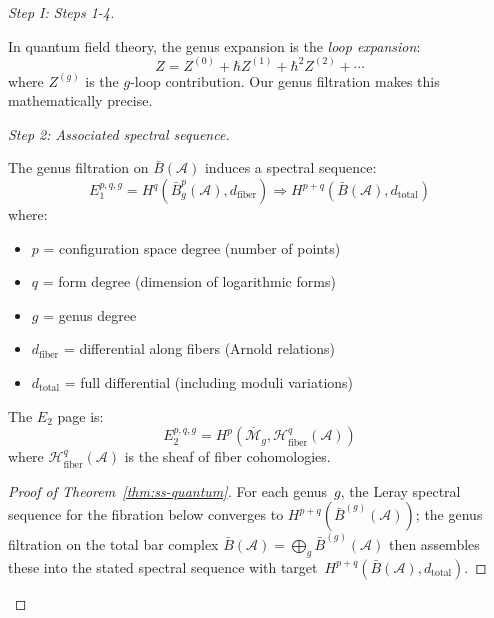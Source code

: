 \begin{proof}[Step I: Steps 1-4]
\begin{remark}
In quantum field theory, the genus expansion is the \emph{loop expansion}:
\begin{equation}
Z = Z^{(0)} + \hbar Z^{(1)} + \hbar^2 Z^{(2)} + \cdots
\end{equation}
where $Z^{(g)}$ is the $g$-loop contribution. Our genus filtration makes this 
mathematically precise.
\end{remark}

\emph{Step 2: Associated spectral sequence.}

\begin{theorem}
\label{thm:ss-quantum}
The genus filtration on $\bar{B}(\mathcal{A})$ induces a spectral sequence:
\begin{equation}
E_1^{p,q,g} = H^q\left(\bar{B}^p_g(\mathcal{A}), d_{\text{fiber}}\right) 
\Longrightarrow H^{p+q}\left(\bar{B}(\mathcal{A}), d_{\text{total}}\right)
\end{equation}
where:
\begin{itemize}
\item $p$ = configuration space degree (number of points)
\item $q$ = form degree (dimension of logarithmic forms)
\item $g$ = genus degree
\item $d_{\text{fiber}}$ = differential along fibers (Arnold relations)
\item $d_{\text{total}}$ = full differential (including moduli variations)
\end{itemize}

The $E_2$ page is:
\begin{equation}
E_2^{p,q,g} = H^p\left(\overline{\mathcal{M}}_g, \mathcal{H}^q_{\text{fiber}}(
\mathcal{A})\right)
\end{equation}
where $\mathcal{H}^q_{\text{fiber}}(\mathcal{A})$ is the sheaf of fiber cohomologies.
\end{theorem}

\begin{proof}[Proof of Theorem~\ref{thm:ss-quantum}]
For each genus~$g$, the Leray spectral sequence for the fibration
below converges to $H^{p+q}(\bar{B}^{(g)}(\mathcal{A}))$;
the genus filtration on the total bar complex
$\bar{B}(\mathcal{A}) = \bigoplus_g \bar{B}^{(g)}(\mathcal{A})$
then assembles these into the stated spectral sequence
with target~$H^{p+q}(\bar{B}(\mathcal{A}), d_{\mathrm{total}})$.


\end{proof}
\end{proof}
